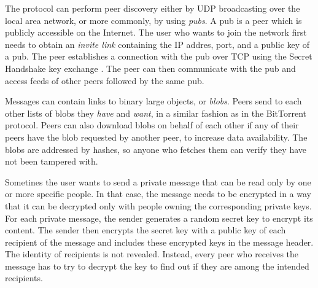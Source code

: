 
The protocol can perform peer discovery either by UDP broadcasting over the local area network, or more commonly, by using \textit{pubs}. A pub is a peer which is publicly accessible on the Internet. The user who wants to join the network first needs to obtain an \textit{invite link} containing the IP addres, port, and a public key of a pub. The peer establishes a connection with the pub over TCP using the Secret Handshake key exchange \cite{secrethandshake}. The peer can then communicate with the pub and access feeds of other peers followed by the same pub.


Messages can contain links to binary large objects, or \textit{blobs}. Peers send to each other lists of blobs they \textit{have} and \textit{want}, in a similar fashion as in the BitTorrent protocol. Peers can also download blobs on behalf of each other if any of their peers have the blob requested by another peer, to increase data availability. The blobs are addressed by hashes, so anyone who fetches them can verify they have not been tampered with.


Sometines the user wants to send a private message that can be read only by one or more specific people. In that case, the message needs to be encrypted in a way that it can be decrypted only with people owning the corresponding private keys. For each private message, the sender generates a random secret key to encrypt its content. The sender then encrypts the secret key with a public key of each recipient of the message and includes these encrypted keys in the message header. The identity of recipients is not revealed. Instead, every peer who receives the message has to try to decrypt the key to find out if they are among the intended recipients.


